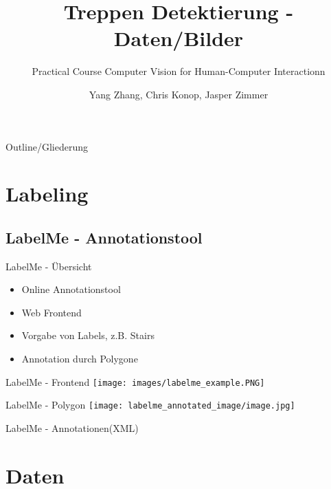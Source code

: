\documentclass[18pt]{beamer}
\title[Daten/Bilder]{Treppen Detektierung - Daten/Bilder}
\subtitle{Practical Course Computer Vision for Human-Computer Interactionn}
\author{Yang Zhang, Chris Konop, Jasper Zimmer}
\institute{Computer Vision for Human-Computer Interaction Lab}
\begin{document}

\begin{frame}
\titlepage
\end{frame}

\begin{frame}{Outline/Gliederung}
\tableofcontents
\end{frame}

\section{Labeling}
\subsection{LabelMe - Annotationstool}
\begin{frame}{LabelMe - Übersicht}
\begin{itemize}
\item Online Annotationstool
\item Web Frontend
\item Vorgabe von Labels, z.B. Stairs
\item Annotation durch Polygone
\end{itemize}
\end{frame}

\begin{frame}{LabelMe - Frontend}
\texttt{[image: images/labelme\_example.PNG]}
\end{frame}

\begin{frame}{LabelMe - Polygon}
\texttt{[image: labelme\_annotated\_image/image.jpg]}
\end{frame}

\begin{frame}{LabelMe - Annotationen(XML)}

\end{frame}

\section{Daten}
\end{document}
